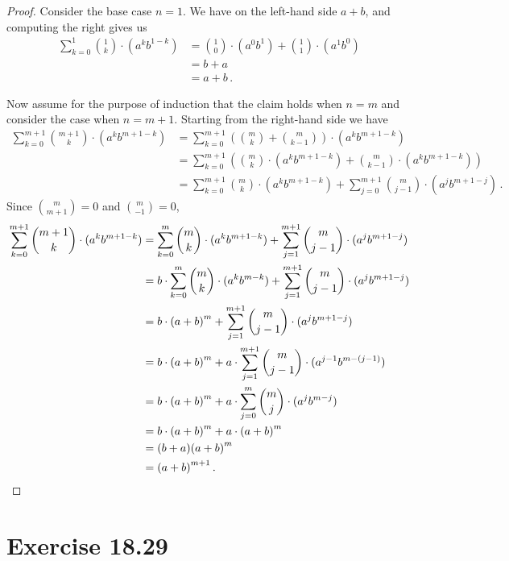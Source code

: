 \documentclass{abrice}
\begin{document}
\begin{proof}
  Consider the base case $n = 1$. We have on the left-hand side $a + b$, and
  computing the right gives us
  \begin{align*}
    \sum_{k=0}^1 {1 \choose k} \cdot (a^k b^{1-k})
    &= {1 \choose 0} \cdot (a^0b^1) + {1 \choose 1} \cdot (a^1b^0) \\
    &= b + a \\
    &= a + b\, .
  \end{align*}

  Now assume for the purpose of induction that the claim holds when $n = m$ and
  consider the case when $n = m + 1$. Starting from the right-hand side we have
  \begin{align*}
    \sum_{k=0}^{m+1} {m + 1 \choose k} \cdot (a^k b^{m+1-k})
    &= \sum_{k=0}^{m+1} \left(  {m \choose k} + {m \choose k-1 } \right) \cdot
      (a^k b^{m+1-k}) \\
    &= \sum_{k=0}^{m+1} \left( {m \choose k} \cdot (a^k b^{m+1-k}) + {m \choose k-1}
      \cdot (a^k b^{m+1-k})  \right) \\
    &= \sum_{k=0}^{m+1} {m \choose k} \cdot (a^k b^{m+1-k}) + \sum_{j=0}^{m+1} {m \choose j-1}
      \cdot (a^j b^{m+1-j})\, .
  \end{align*}
  Since ${m \choose m + 1} = 0$ and ${m \choose -1} = 0$,
  \begin{align*}
    \sum_{k=0}^{m+1} {m + 1 \choose k} \cdot (a^k b^{m+1-k})
    &= \sum_{k=0}^{m} {m \choose k} \cdot (a^k b^{m+1-k}) + \sum_{j=1}^{m+1} {m \choose j-1}
      \cdot (a^j b^{m+1-j}) \\
    &= b \cdot \sum_{k=0}^{m} {m \choose k} \cdot (a^k b^{m-k}) +
      \sum_{j=1}^{m+1} {m \choose j-1}
      \cdot (a^j b^{m+1-j}) \\
    &= b \cdot {(a + b)}^m + \sum_{j=1}^{m+1} {m \choose j-1} \cdot (a^j
      b^{m+1-j}) \\
    &= b \cdot {(a + b)}^m + a \cdot \sum_{j=1}^{m+1} {m \choose j-1} \cdot
      (a^{j-1} b^{m-(j-1)}) \\
    &= b \cdot {(a + b)}^m + a \cdot \sum_{j=0}^{m} {m \choose j} \cdot
      (a^{j} b^{m-j}) \\
    &= b \cdot {(a + b)}^m + a \cdot {(a + b)}^m \\
    &= (b + a){(a + b)}^m \\
    &= {(a + b)}^{m+1}\, . \qedhere
  \end{align*}
\end{proof}

\section{Exercise 18.29}
\end{document}
